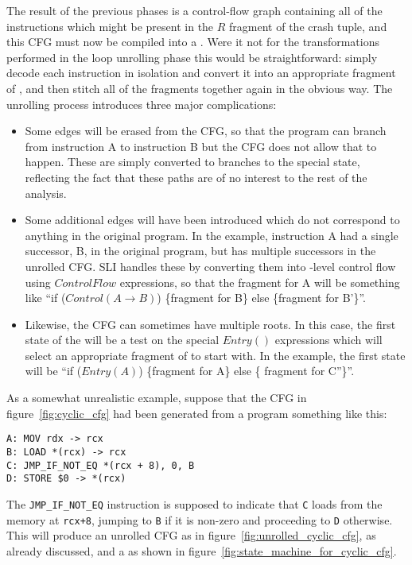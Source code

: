 The result of the previous phases is a control-flow graph containing
all of the instructions which might be present in the $R$ fragment of
the crash tuple, and this CFG must now be compiled into a
\StateMachine.  Were it not for the transformations performed in the
loop unrolling phase this would be straightforward: simply decode each
instruction in isolation and convert it into an appropriate fragment
of \StateMachine, and then stitch all of the fragments together again
in the obvious way.  The unrolling process introduces three major
complications:

\begin{itemize}
\item
  Some edges will be erased from the CFG, so that the program can
  branch from instruction A to instruction B but the CFG does not
  allow that to happen.  These are simply converted to branches to the
  special  state, reflecting the fact that these
  paths are of no interest to the rest of the analysis.

\item
  Some additional edges will have been introduced which do not
  correspond to anything in the original program.  In the example,
  instruction A had a single successor, B, in the original program,
  but has multiple successors in the unrolled CFG.  SLI handles these
  by converting them into \StateMachine-level control flow using
  $ControlFlow$ expressions, so that the {\StateMachine} fragment for A
  will be something like ``if ($Control(A{\rightarrow}B)$) \{fragment for B\} else
  \{fragment for B'\}''.

\item
  Likewise, the CFG can sometimes have multiple roots.  In this case,
  the first state of the {\StateMachine} will be a test on the special
  $Entry()$ expressions which will select an appropriate fragment of
  {\StateMachine} to start with.  In the example, the first state will
  be ``if ($Entry(A)$) \{fragment for A\} else \{ fragment for
  C''\}''.
\end{itemize}

As a somewhat unrealistic example, suppose that the CFG in
figure~\ref{fig:cyclic_cfg} had been generated from a program
something like this:

\begin{verbatim}
A: MOV rdx -> rcx
B: LOAD *(rcx) -> rcx
C: JMP_IF_NOT_EQ *(rcx + 8), 0, B
D: STORE $0 -> *(rcx)
\end{verbatim}

The \verb|JMP_IF_NOT_EQ| instruction is supposed to indicate that
\verb|C| loads from the memory at \verb|rcx+8|, jumping to \verb|B| if
it is non-zero and proceeding to \verb|D| otherwise.  This will
produce an unrolled CFG as in figure~\ref{fig:unrolled_cyclic_cfg}, as
already discussed, and a {\StateMachine} as shown in
figure~\ref{fig:state_machine_for_cyclic_cfg}.

